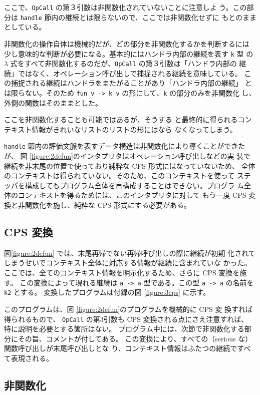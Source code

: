 ここで、\texttt{OpCall} の第３引数は非関数化されていないことに注意しよ
う。この部分は \texttt{handle} 節内の継続とは限らないので、ここでは非関数化せずに
もとのままとしている。

非関数化の操作自体は機械的だが、どの部分を非関数化するかを判断するには
少し意味的な判断が必要になる。基本的にはハンドラ内部の継続を表す \texttt{k} 型
の $\lambda$ 式をすべて非関数化するのだが、\texttt{OpCall} の第３引数は「ハンドラ内部の
継続」ではなく、オペレーション呼び出しで捕捉される継続を意味している。
この捕捉される継続はハンドラをまたがることがあり「ハンドラ内部の継続」
とは限らない。そのため \texttt{fun v -> k v} の形にして、\texttt{k} の部分のみを非関数化
し、外側の関数はそのままとした。

ここを非関数化することも可能ではあるが、そうする
と最終的に得られるコンテキスト情報がきれいなリストのリストの形にはなら
なくなってしまう。

\texttt{handle} 節内の評価文脈を表すデータ構造は非関数化により導くことができたが、
図 \ref{figure:2defun}のインタプリタはオペレーション呼び出しなどの実
装で継続を非末尾の位置で使っており純粋な CPS 形式にはなっていないため、
全体のコンテキストは得られていない。そのため、このコンテキストを使って
ステッパを構成してもプログラム全体を再構成することはできない。プログラ
ム全体のコンテキストを得るためには、このインタプリタに対して
もう一度 CPS 変換と非関数化を施し、純粋な CPS 形式にする必要がある。

\subsection{CPS 変換}
\label{subsection:3cps}

図\ref{figure:2defun} では、末尾再帰でない再帰呼び出しの際に継続が初期
化されてしまうせいでコンテキスト全体に対応する情報が継続に含まれていな
かった。
ここでは、全てのコンテキスト情報を明示化するため、さらに CPS 変換を施
す。
この変換によって現れる継続は \texttt{a -> a} 型である。この型
\texttt{a -> a} の名前を \texttt{k2} とする。
変換したプログラムは付録の図 \ref{figure:3cps} に示す。

このプログラムは、図 \ref{figure:2defun}のプログラムを機械的に CPS 変
換すれば得られるもので、
\texttt{OpCall} の第3引数も CPS 変換される点にさえ注意すれば、
特に説明を必要とする箇所はない。
プログラム中には、次節で非関数化する部分にその旨、コメントが付してある。
この変換により、すべての（serious な）関数呼び出しが末尾呼び出しとな
り、コンテキスト情報はふたつの継続ですべて表現される。

\subsection{非関数化}
\label{subsection:4defun}

